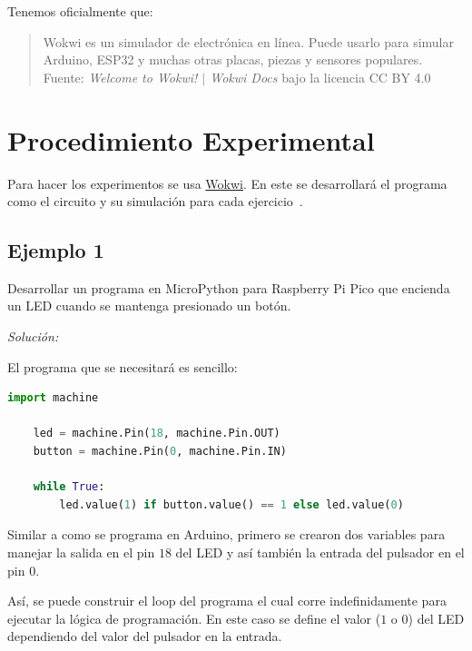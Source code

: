 \documentclass{article}
\begin{document}
    \bigbreak

    Tenemos oficialmente que:

    \begin{quote}
        Wokwi es un simulador de electrónica en línea. Puede usarlo para
        simular Arduino, ESP32 y muchas otras placas, piezas y sensores
        populares.
        \\ \footnotesize
        Fuente: \textit{Welcome to Wokwi! $\mid$ Wokwi Docs} bajo la licencia
        CC BY 4.0
    \end{quote}

    \section{Procedimiento Experimental}\label{sec:procedimiento-experimental}

    Para hacer los experimentos se usa \href{https://wokwi.com}{Wokwi}. En
    este se desarrollará el programa como el circuito y su simulación para
    cada ejercicio~\cite{ricardo-adonis-caraccioli-abrego-2022}.

    \subsection{Ejemplo 1}

    Desarrollar un programa en MicroPython para Raspberry Pi Pico que
    encienda un LED cuando se mantenga presionado un botón.

    \bigbreak

    \textit{Solución:}

    \bigbreak

    El programa que se necesitará es sencillo:

    \begin{lstlisting}[language=Python, caption={Programa para el ejemplo 1}]
    import machine

    led = machine.Pin(18, machine.Pin.OUT)
    button = machine.Pin(0, machine.Pin.IN)

    while True:
        led.value(1) if button.value() == 1 else led.value(0)
    \end{lstlisting}

    Similar a como se programa en Arduino, primero se crearon dos variables
    para manejar la salida en el pin $18$ del LED y así también la entrada
    del pulsador en el pin $0$.

    \bigbreak

    Así, se puede construir el loop del programa el cual corre
    indefinidamente para ejecutar la lógica de programación. En este caso se
    define el valor ($1$ o $0$) del LED dependiendo del valor del pulsador en
    la entrada.
\end{document}
